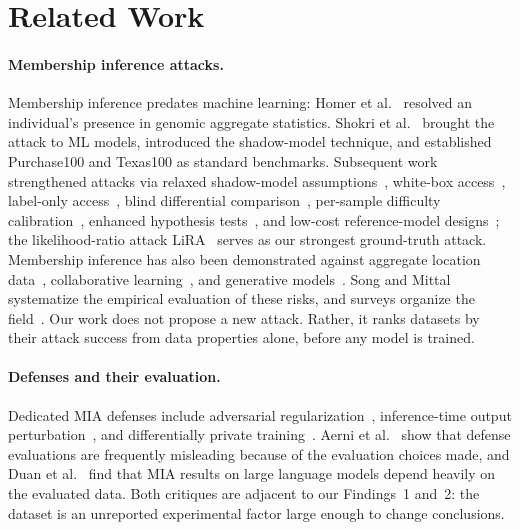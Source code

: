 \section{Related Work}
\label{sec:related}

\paragraph{Membership inference attacks.}
Membership inference predates machine learning: Homer et
al.~\cite{homer2008resolving} resolved an individual's presence in
genomic aggregate statistics. Shokri et al.~\cite{shokri2017membership}
brought the attack to ML models, introduced the shadow-model technique,
and established Purchase100 and Texas100 as standard benchmarks.
Subsequent work strengthened attacks via relaxed shadow-model
assumptions~\cite{salem2019ml}, white-box
access~\cite{nasr2019comprehensive,leino2020stolen}, label-only
access~\cite{choquette2021label}, blind differential
comparison~\cite{hui2021blindmi}, per-sample difficulty
calibration~\cite{watson2022importance,carlini2022lira}, enhanced
hypothesis tests~\cite{ye2022enhanced}, and low-cost
reference-model designs~\cite{zarifzadeh2024rmia}; the likelihood-ratio
attack LiRA~\cite{carlini2022lira} serves as our strongest ground-truth
attack. Membership inference has also been demonstrated against
aggregate location data~\cite{pyrgelis2018knock}, collaborative
learning~\cite{melis2019exploiting}, and generative
models~\cite{hayes2019logan}. Song and
Mittal~\cite{song2021systematic} systematize the empirical evaluation of
these risks, and surveys organize the field~\cite{hu2022membership,papernot2018sok}.
Our work does not propose a new attack. Rather, it ranks datasets by
their attack success from data properties alone, before any model is
trained.

\paragraph{Defenses and their evaluation.}
Dedicated MIA defenses include adversarial
regularization~\cite{nasr2018machine}, inference-time output
perturbation~\cite{jia2019memguard}, and differentially private
training~\cite{abadi2016deep}. Aerni et al.~\cite{aerni2024evaluations}
show that defense evaluations are frequently misleading because of the
evaluation choices made, and Duan et al.~\cite{duan2024membership} find
that MIA results on large language models depend heavily on the
evaluated data. Both critiques are adjacent to our Findings~1 and~2:
the dataset is an unreported experimental factor large enough to change
conclusions.

